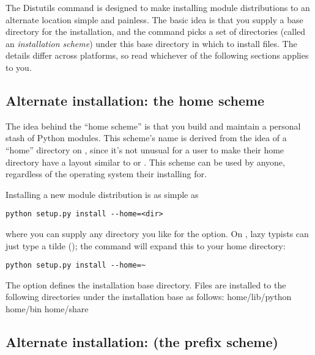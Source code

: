 \documentclass{howto}
\begin{document}
The Distutils  command is designed to make installing
module distributions to an alternate location simple and painless.  The
basic idea is that you supply a base directory for the installation, and
the  command picks a set of directories (called an
\emph{installation scheme}) under this base directory in which to
install files.  The details differ across platforms, so read whichever
of the following sections applies to you.


\subsection{Alternate installation: the home scheme}
\label{alt-install-prefix}

The idea behind the ``home scheme'' is that you build and maintain a
personal stash of Python modules.  This scheme's name is derived from
the idea of a ``home'' directory on \UNIX, since it's not unusual for
a \UNIX{} user to make their home directory have a layout similar to
 or .  This scheme can be used by
anyone, regardless of the operating system their installing for.

Installing a new module distribution is as simple as

\begin{verbatim}
python setup.py install --home=<dir>
\end{verbatim}

where you can supply any directory you like for the
 option.  On \UNIX, lazy typists can just type a
tilde (\code{\textasciitilde}); the  command will
expand this to your home directory:

\begin{verbatim}
python setup.py install --home=~
\end{verbatim}

The  option defines the installation base
directory.  Files are installed to the following directories under the
installation base as follows:
              {home}{/lib/python}
              {home}{/bin}
              {home}{/share}




\subsection{Alternate installation: \UNIX{} (the prefix scheme)}
\label{alt-install-home}
\end{document}
